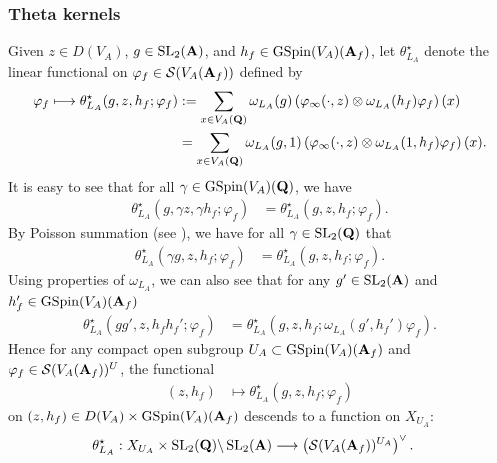 \documentclass{amsart}
\theoremstyle{definition}
\begin{document}
\subsubsection{Theta kernels}

Given $z \in D(V_A)$, $g \in \operatorname{SL}_2({\bf{A}})$, and $h_f \in \operatorname{GSpin}(V_A)({\bf{A}}_f)$,
let $\theta_{L_A}^{\star}$ denote the linear functional on $\varphi_f \in \mathcal{S}(V_A({\bf{A}}_f))$ defined by
\begin{equation}\begin{aligned}\label{functional} \varphi_f \longmapsto \theta_{L_A}^{\star}(g, z, h_f; \varphi_f ) 
&:= \sum\limits_{x \in V_A({\bf{Q}})} \omega_{L_A}(g) \left( \varphi_{\infty}(\cdot, z) \otimes \omega_{L_A}(h_f) \varphi_f \right) (x) \\
&=  \sum\limits_{x \in V_A({\bf{Q}})} \omega_{L_A}(g,1) \left( \varphi_{\infty}(\cdot, z) \otimes \omega_{L_A}(1,h_f) \varphi_f \right) (x). \end{aligned}\end{equation}
It is easy to see that for all $\gamma \in \operatorname{GSpin}(V_A)({\bf{Q}})$, we have
\begin{align*} \theta_{L_A}^{\star}(g, \gamma z, \gamma h_f; \varphi_f) &= \theta_{L_A}^{\star}(g, z, h_f; \varphi_f). \end{align*}
By Poisson summation (see \cite{We, KuBL}), we have for all $\gamma \in \operatorname{SL}_2({\bf{Q}})$ that 
\begin{align*} \theta_{L_A}^{\star}(\gamma g, z,  h_f; \varphi_f) &= \theta_{L_A}^{\star}(g, z, h_f; \varphi_f). \end{align*}
Using properties of $\omega_{L_A}$, we can also see that for any $g' \in \operatorname{SL}_2({\bf{A}})$ and $h_f' \in \operatorname{GSpin}(V_A)({\bf{A}}_f)$
\begin{align}\label{1.23} \theta_{L_A}^{\star}(gg', z,  h_f h_f'; \varphi_f) 
&= \theta_{L_A}^{\star}(g, z, h_f; \omega_{L_A}(g', h_f') \varphi_f). \end{align}
Hence for any compact open subgroup $U_A \subset \operatorname{GSpin}(V_A)({\bf{A}}_f)$ and $\varphi_f \in \mathcal{S}(V_A({\bf{A}}_f))^U$, the functional 
\begin{align*} (z, h_f) &\longmapsto \theta_{L_A}^{\star}(g, z, h_f; \varphi_f) \end{align*} 
on $(z, h_f) \in D(V_A) \times \operatorname{GSpin}(V_A)({\bf{A}}_f)$ descends to a function on $X_{U_A}$:
\begin{align*} \theta_{L_A}^{\star}: X_{U_A} \times \operatorname{SL}_2({\bf{Q}}) \backslash \operatorname{SL}_2({\bf{A}})
&\longrightarrow \left( \mathcal{S}(V_A({\bf{A}}_f))^{U_A}\right)^{\vee}. \end{align*}
\end{document}
